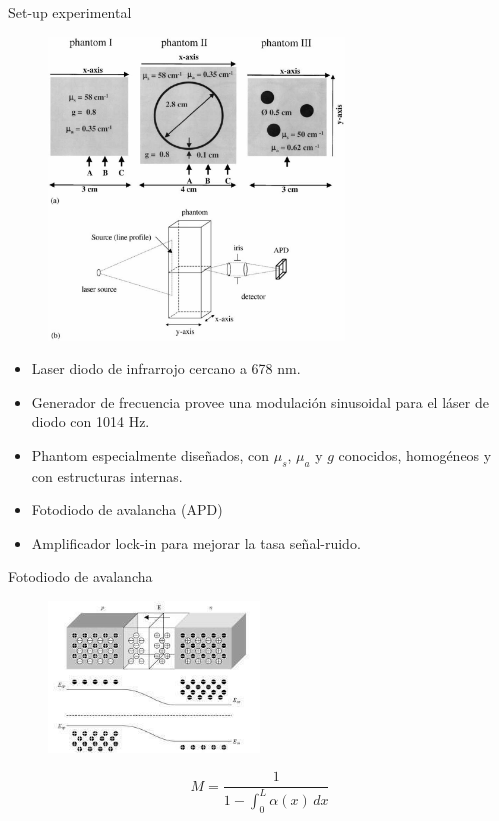 \documentclass[10pt]{beamer}
\begin{document}
\begin{frame}[fragile]{Set-up experimental}

\begin{figure}
 \includegraphics[trim={0 0 0 17cm},clip,width=0.7\textwidth]{fig1.eps}
\end{figure}
\begin{itemize}
 \item Laser diodo de infrarrojo cercano a 678 nm.
 \item Generador de frecuencia provee una modulaci\'on sinusoidal para
 el l\'aser de diodo con 1014 Hz.
 \item Phantom especialmente dise\~nados, con $\mu_s$, $\mu_a$ y $g$ conocidos, homog\'eneos y con estructuras internas.
 \item Fotodiodo de avalancha (APD) 
 \item Amplificador lock-in para mejorar la tasa se\~nal-ruido.
\end{itemize}

\end{frame}
\begin{frame}[fragile]{Fotodiodo de avalancha}

\begin{figure}
 \includegraphics[width=0.5\textwidth]{figuras/Diodo_avalancha.jpg}
\end{figure}
\pause
\begin{equation*}
M=\frac{1}{1-\int_0^L \alpha(x)\,dx}
\end{equation*}

\end{frame}
\end{document}
